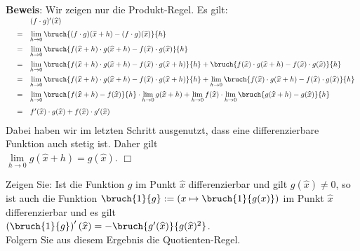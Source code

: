 \noindent
\textbf{Beweis}: Wir zeigen nur die Produkt-Regel.  Es gilt:
\\[0.3cm]
\hspace*{0.3cm}
$
\begin{array}[t]{lcl}
 &   &  (f \cdot g)'(\widehat{x}) \\[0.2cm]
 & = & \lim\limits_{h \rightarrow 0} \bruch{(f\cdot g)(\widehat{x} + h) - (f\cdot g)(\widehat{x})}{h} \\[0.3cm]
 & = &  \lim\limits_{h \rightarrow 0} \bruch{f(\widehat{x} + h)\cdot g(\widehat{x} + h) - f(\widehat{x})\cdot g(\widehat{x})}{h} \\[0.3cm]
 & = &  \lim\limits_{h \rightarrow 0} \bruch{f(\widehat{x} + h)\cdot g(\widehat{x} + h) - f(\widehat{x})\cdot g(\widehat{x} + h)}{h} + 
                                      \bruch{f(\widehat{x})\cdot g(\widehat{x} + h) - f(\widehat{x})\cdot g(\widehat{x})}{h} \\[0.3cm]
 & = &  \lim\limits_{h \rightarrow 0} \bruch{f(\widehat{x} + h)\cdot g(\widehat{x} + h) - f(\widehat{x})\cdot g(\widehat{x} + h)}{h} +
        \lim\limits_{h \rightarrow 0} \bruch{f(\widehat{x})\cdot g(\widehat{x} + h) - f(\widehat{x})\cdot g(\widehat{x})}{h} \\[0.3cm]
 & = &  \lim\limits_{h \rightarrow 0} \bruch{f(\widehat{x} + h) - f(\widehat{x})}{h} \cdot \lim\limits_{h \rightarrow 0} g(\widehat{x}+h) +
        \lim\limits_{h \rightarrow 0} f(\widehat{x}) \cdot \lim\limits_{h \rightarrow 0} \bruch{g(\widehat{x} + h) - g(\widehat{x})}{h} \\[0.4cm]
 & = &  f'(\widehat{x}) \cdot  g(\widehat{x}) + f(\widehat{x}) \cdot g'(\widehat{x}) \\[0.3cm]
\end{array}
$
\\[0.3cm]
Dabei haben wir im letzten Schritt ausgenutzt, dass eine differenzierbare Funktion auch stetig ist.
Daher gilt 
\\[0.2cm]
\hspace*{1.3cm}
$\lim\limits_{h \rightarrow 0} g(\widehat{x} + h) = g(\widehat{x})$. \hspace*{\fill} $\Box$
\vspace*{0.3cm}

\exercise
Zeigen Sie: Ist die Funktion $g$ im Punkt $\widehat{x}$ differenzierbar und gilt
$g(\widehat{x}) \not= 0$, so ist auch die Funktion 
$\bruch{1}{g} := \left(x \mapsto \bruch{1}{g(x)}\right)$ im Punkt $\widehat{x}$
differenzierbar und es gilt 
\\[0.3cm]
\hspace*{1.3cm} 
$\left(\bruch{1}{g}\right)'(\widehat{x}) = -\bruch{g'(\widehat{x})}{g(\widehat{x})^2}$.
\\[0.3cm]
Folgern Sie aus diesem Ergebnis die Quotienten-Regel.
\eox


